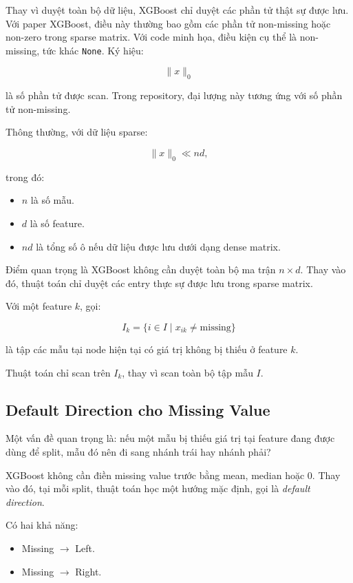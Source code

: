 Thay vì duyệt toàn bộ dữ liệu, XGBoost chỉ duyệt các phần tử thật sự được lưu. Với paper XGBoost, điều này thường bao gồm các phần tử non-missing hoặc non-zero trong sparse matrix. Với code minh họa, điều kiện cụ thể là non-missing, tức khác \texttt{None}. Ký hiệu:

\[
\|x\|_0
\]

là số phần tử được scan. Trong repository, đại lượng này tương ứng với số phần tử non-missing.

Thông thường, với dữ liệu sparse:

\[
\|x\|_0 \ll nd,
\]

trong đó:

\begin{itemize}
    \item $n$ là số mẫu.
    \item $d$ là số feature.
    \item $nd$ là tổng số ô nếu dữ liệu được lưu dưới dạng dense matrix.
\end{itemize}

Điểm quan trọng là XGBoost không cần duyệt toàn bộ ma trận $n \times d$. Thay vào đó, thuật toán chỉ duyệt các entry thực sự được lưu trong sparse matrix.

Với một feature $k$, gọi:

\[
I_k = \{i \in I \mid x_{ik} \neq \text{missing}\}
\]

là tập các mẫu tại node hiện tại có giá trị không bị thiếu ở feature $k$.

Thuật toán chỉ scan trên $I_k$, thay vì scan toàn bộ tập mẫu $I$.

\subsection{Default Direction cho Missing Value}

Một vấn đề quan trọng là: nếu một mẫu bị thiếu giá trị tại feature đang được dùng để split, mẫu đó nên đi sang nhánh trái hay nhánh phải?

XGBoost không cần điền missing value trước bằng mean, median hoặc $0$. Thay vào đó, tại mỗi split, thuật toán học một hướng mặc định, gọi là \textit{default direction}.

Có hai khả năng:

\begin{itemize}
    \item Missing $\rightarrow$ Left.
    \item Missing $\rightarrow$ Right.
\end{itemize}

